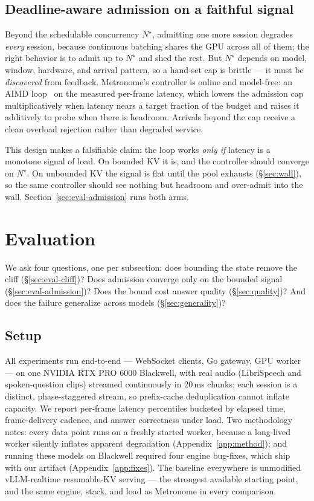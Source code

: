 \subsection{Deadline-aware admission on a faithful signal}
\label{sec:admission}

Beyond the schedulable concurrency $N^\star$, admitting one more session degrades \emph{every} session,
because continuous batching shares the GPU across all of them; the right behavior is to admit up to
$N^\star$ and shed the rest. But $N^\star$ depends on model, window, hardware, and arrival
pattern, so a hand-set cap is brittle --- it must be \emph{discovered} from feedback. Metronome's
controller is online and model-free: an AIMD loop~\citep{aimd,jacobson} on the measured per-frame
latency, which lowers the admission cap multiplicatively when latency nears a target fraction of the
budget and raises it additively to probe when there is headroom. Arrivals beyond the cap receive a clean
overload rejection rather than degraded service.

This design makes a falsifiable claim: the loop works \emph{only if} latency is a monotone signal of
load. On bounded KV it is, and the controller should converge on $N^\star$. On unbounded KV the signal is
flat until the pool exhausts (\S\ref{sec:wall}), so the same controller should see nothing but headroom
and over-admit into the wall. Section~\ref{sec:eval-admission} runs both arms.

\section{Evaluation}
\label{sec:eval}

We ask four questions, one per subsection: does bounding the state remove the cliff
(\S\ref{sec:eval-cliff})? Does admission converge only on the bounded signal
(\S\ref{sec:eval-admission})? Does the bound cost answer quality (\S\ref{sec:quality})? And does the
failure generalize across models (\S\ref{sec:generality})?

\subsection{Setup}
\label{sec:method}

All experiments run end-to-end --- WebSocket clients, Go gateway, GPU worker --- on one NVIDIA RTX PRO
6000 Blackwell, with real audio (LibriSpeech and spoken-question clips) streamed continuously in 20\,ms
chunks; each session is a distinct, phase-staggered stream, so prefix-cache deduplication cannot
inflate capacity. We report per-frame latency percentiles bucketed by elapsed time, frame-delivery
cadence, and answer correctness under load. Two methodology notes: every data point runs on a freshly
started worker, because a long-lived worker silently inflates apparent degradation
(Appendix~\ref{app:method}); and running these models on Blackwell required four engine bug-fixes,
which ship with our artifact (Appendix~\ref{app:fixes}). The baseline everywhere is unmodified
vLLM-realtime resumable-KV serving --- the strongest available starting point, and the same engine,
stack, and load as Metronome in every comparison.

